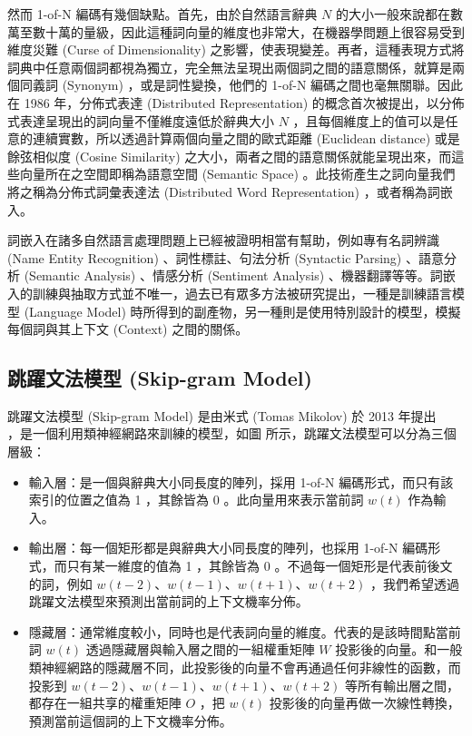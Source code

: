 然而 1-of-N 編碼有幾個缺點。首先，由於自然語言辭典 $N$ 的大小一般來說都在數萬至數十萬的量級，因此這種詞向量的維度也非常大，在機器學問題上很容易受到維度災難 (Curse of Dimensionality) 之影響，使表現變差。再者，這種表現方式將詞典中任意兩個詞都視為獨立，完全無法呈現出兩個詞之間的語意關係，就算是兩個同義詞 (Synonym) ，或是詞性變換，他們的 1-of-N 編碼之間也毫無關聯。因此在 1986 年，分佈式表達 (Distributed Representation) 的概念首次被提出，以分佈式表達呈現出的詞向量不僅維度遠低於辭典大小 $N$ ，且每個維度上的值可以是任意的連續實數，所以透過計算兩個向量之間的歐式距離 (Euclidean distance) 或是餘弦相似度 (Cosine Similarity) 之大小，兩者之間的語意關係就能呈現出來，而這些向量所在之空間即稱為語意空間 (Semantic Space) 。此技術產生之詞向量我們將之稱為分佈式詞彙表達法 (Distributed Word Representation) ，或者稱為詞嵌入。

詞嵌入在諸多自然語言處理問題上已經被證明相當有幫助，例如專有名詞辨識 (Name Entity Recognition) 、詞性標註、句法分析 (Syntactic Parsing) 、語意分析 (Semantic Analysis) 、情感分析 (Sentiment Analysis) 、機器翻譯等等。詞嵌入的訓練與抽取方式並不唯一，過去已有眾多方法被研究提出，一種是訓練語言模型 (Language Model) 時所得到的副產物，另一種則是使用特別設計的模型，模擬每個詞與其上下文 (Context) 之間的關係。%
\subsection{跳躍文法模型 (Skip-gram Model)}
跳躍文法模型 (Skip-gram Model) 是由米式 (Tomas Mikolov) 於 2013 年提出 ~\cite{mikolov2013distributed}~\cite{mikolov2013efficient} ，是一個利用類神經網路來訓練的模型，如圖%
所示，跳躍文法模型可以分為三個層級：

\begin{itemize}
    \item 輸入層：是一個與辭典大小同長度的陣列，採用 1-of-N 編碼形式，而只有該索引的位置之值為 1 ，其餘皆為 0 。此向量用來表示當前詞 $w(t)$ 作為輸入。
    \item 輸出層：每一個矩形都是與辭典大小同長度的陣列，也採用 1-of-N 編碼形式，而只有某一維度的值為 1 ，其餘皆為 0 。不過每一個矩形是代表前後文的詞，例如 $w(t-2)$、$w(t-1)$、$w(t+1)$、$w(t+2)$ ，我們希望透過跳躍文法模型來預測出當前詞的上下文機率分佈。
    \item 隱藏層：通常維度較小，同時也是代表詞向量的維度。代表的是該時間點當前詞 $w(t)$ 透過隱藏層與輸入層之間的一組權重矩陣 $W$ 投影後的向量。和一般類神經網路的隱藏層不同，此投影後的向量不會再通過任何非線性的函數，而投影到 $w(t-2)$、$w(t-1)$、$w(t+1)$、$w(t+2)$ 等所有輸出層之間，都存在一組共享的權重矩陣 $O$ ，把 $w(t)$ 投影後的向量再做一次線性轉換，預測當前這個詞的上下文機率分佈。
\end{itemize}

